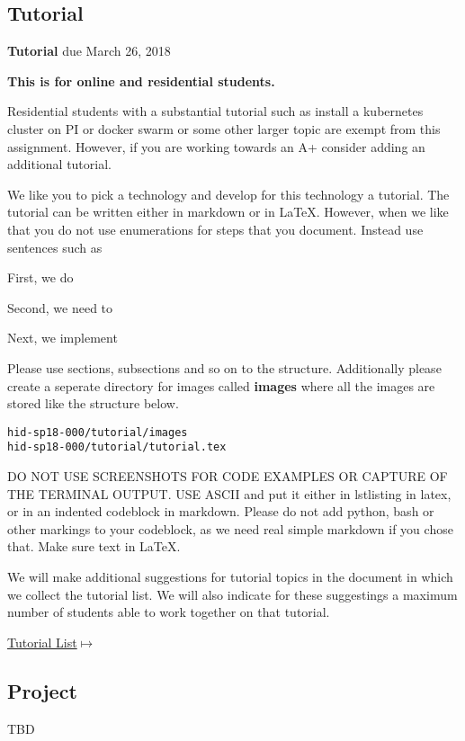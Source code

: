 \subsection{Tutorial}
\label{E:616-tutorial}

\begin{exercise} {\bf Tutorial} due March 26, 2018

{\bf This is for online and residential students.}

Residential students with a substantial tutorial such as install a
kubernetes cluster on PI or docker swarm or some other larger topic
are exempt from this assignment. However, if you are working towards
an A+ consider adding an additional tutorial.

 
We like you to pick a technology and develop for this technology a
tutorial. The tutorial can be written either in markdown or in
LaTeX. However, when we like that you do not use enumerations for
steps that you document. Instead use sentences such as
 
First, we do 
 
Second, we need to
 
Next, we implement
 
Please use sections, subsections and so on to the
structure. Additionally please create a seperate directory for images
called {\bf images} where all the images are stored like the structure
below. 

\begin{lstlisting}
hid-sp18-000/tutorial/images
hid-sp18-000/tutorial/tutorial.tex
\end{lstlisting}
 
DO NOT USE SCREENSHOTS FOR CODE EXAMPLES OR CAPTURE OF THE TERMINAL
OUTPUT.  USE ASCII and put it either in lstlisting in latex, or in an
indented codeblock in markdown. Please do not add python, bash or
other markings to your codeblock, as we need real simple markdown if
you chose that. Make sure text in LaTeX.

 
We will make additional suggestions for tutorial topics in the
document in which we collect the tutorial list. We will also indicate
for these suggestings a maximum number of students able to work
together on that tutorial.

{\hfill
  \href{https://docs.google.com/document/d/1L2-wYc7S7hb5u6ZNtKpTvlXqKMkqq-B38hlaBCw-eww/edit?usp=sharing}{Tutorial
    List$\mapsto$}}



\end{exercise} 

\subsection{Project}


\begin{exercise} 

TBD

\end{exercise} 

